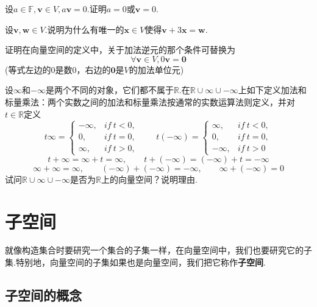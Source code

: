 \documentclass[lang=cn, zihao=5]{elegantbook}
\newcommand{\R}{\mathbb{R}}
\newcommand{\F}{\mathbb{F}}
\begin{document}
\begin{exercise}
	设$a \in \F, \boldsymbol{v} \in V, a\boldsymbol{v}=0$.证明$a=0$或$\boldsymbol{v}=0$.
\end{exercise}

\begin{exercise}
	设$\boldsymbol{v},\boldsymbol{w} \in V$.说明为什么有唯一的$\boldsymbol{x} \in V$使得$\boldsymbol{v} + 3\boldsymbol{x} = \boldsymbol{w}$.
\end{exercise}

\begin{exercise}
	证明在向量空间的定义中，关于加法逆元的那个条件可替换为$$\forall \boldsymbol{v} \in V, 0\boldsymbol{v}=\boldsymbol{0}$$
	(等式左边的$0$是数$0$，右边的$\boldsymbol{0}$是$V$的加法单位元)
\end{exercise}

\begin{exercise}
	设$\infty$和$-\infty$是两个不同的对象，它们都不属于$\R$.在$\R \cup {\infty} \cup {-\infty}$上如下定义加法和标量乘法：两个实数之间的加法和标量乘法按通常的实数运算法则定义，并对$t \in \R$定义$$
	t\infty = \begin{cases}
		-\infty , &if ~ t<0, \\
		0 , &if ~ t=0, \\
		\infty , &if ~ t>0,
	\end{cases} \qquad
	t(-\infty) = \begin{cases}
		\infty , &if ~ t<0, \\
		0 , &if ~ t=0, \\
		-\infty , &if ~ t>0
	\end{cases}$$
	$$t + \infty = \infty + t = \infty , \qquad t+(-\infty) = (-\infty)+t = -\infty$$
	$$\infty + \infty = \infty , \qquad (-\infty) + (-\infty) = -\infty , \qquad \infty + (-\infty) = 0$$
	试问$\R \cup {\infty} \cup {-\infty}$是否为$\R$上的向量空间？说明理由.
\end{exercise}


\newpage
\section{子空间}

就像构造集合时要研究一个集合的子集一样，在向量空间中，我们也要研究它的子集.特别地，向量空间的子集如果也是向量空间，我们把它称作\textbf{子空间}.

\subsection{子空间的概念}
\end{document}
